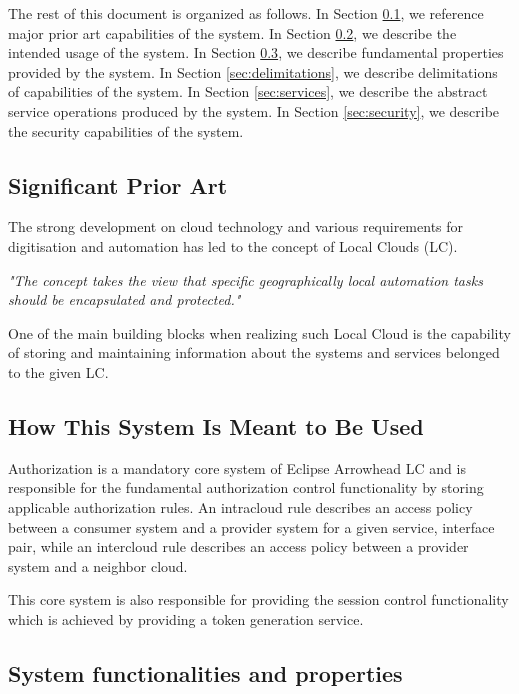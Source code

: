 \documentclass[a4paper]{arrowhead}
\begin{document}
The rest of this document is organized as follows.
In Section \ref{sec:prior_art}, we reference major prior art capabilities
of the system.
In Section \ref{sec:use}, we describe the intended usage of the system.
In Section \ref{sec:properties}, we describe fundamental properties
provided by the system.
In Section \ref{sec:delimitations}, we describe delimitations of capabilities
of the system.
In Section \ref{sec:services}, we describe the abstract service
operations produced by the system.
In Section \ref{sec:security}, we describe the security capabilities
of the system.

\newpage

\subsection{Significant Prior Art}
\label{sec:prior_art}

The strong development on cloud technology and various requirements for digitisation and automation has led to the concept of Local Clouds (LC).

\textit{"The concept takes the view that specific geographically local automation tasks should be encapsulated and protected."} \cite{jerker2017localclouds}

One of the main building blocks when realizing such Local Cloud is the capability of storing and maintaining information about the systems and services belonged to the given LC.

\subsection{How This System Is Meant to Be Used}
\label{sec:use}

Authorization is a mandatory core system of Eclipse Arrowhead LC and is responsible for the fundamental authorization control functionality by storing applicable authorization rules. An intracloud rule describes an access policy between a consumer system and a provider system for a given service, interface pair, while an intercloud rule describes an access policy between a provider system and a neighbor cloud.

This core system is also responsible for providing the session control functionality which is achieved by providing a token generation service. 

\subsection{System functionalities and properties}
\label{sec:properties}
\end{document}
